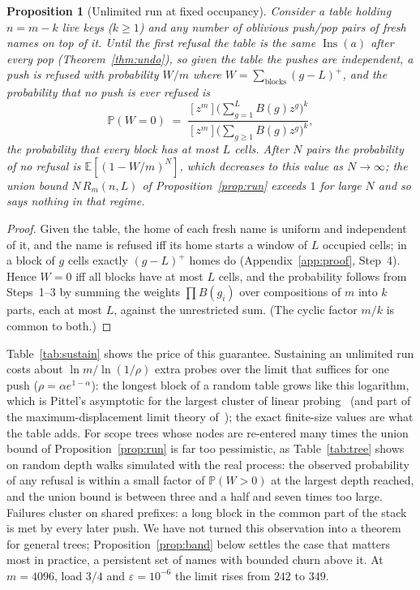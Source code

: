 \documentclass[11pt,a4paper]{article}
\newtheorem{proposition}[theorem]{Proposition}
\theoremstyle{definition}
\theoremstyle{remark}
\newcommand{\Prob}{\mathbb{P}}
\newcommand{\E}{\mathbb{E}}
\DeclareMathOperator{\Ins}{Ins}
\begin{document}
\begin{proposition}[Unlimited run at fixed occupancy]\label{prop:sustain}
Consider a table holding $n=m-k$ live keys ($k\ge1$) and any number of oblivious push/pop pairs of fresh names on top of it. Until the first refusal the table is the same $\Ins(a)$ after every pop (Theorem~\ref{thm:undo}), so given the table the pushes are independent, a push is refused with probability $W/m$ where $W=\sum_{\text{blocks}}(g-L)^+$, and the probability that \emph{no} push is ever refused is
\[
\Prob(W=0)\;=\;\frac{[z^m]\bigl(\sum_{g=1}^{L}B(g)z^g\bigr)^{k}}{[z^m]\bigl(\sum_{g\ge1}B(g)z^g\bigr)^{k}} ,
\]
the probability that every block has at most $L$ cells. After $N$ pairs the probability of no refusal is $\E[(1-W/m)^N]$, which decreases to this value as $N\to\infty$; the union bound $N\,R_m(n,L)$ of Proposition~\ref{prop:run} exceeds $1$ for large $N$ and so says nothing in that regime.
\end{proposition}
\begin{proof}
Given the table, the home of each fresh name is uniform and independent of it, and the name is refused iff its home starts a window of $L$ occupied cells; in a block of $g$ cells exactly $(g-L)^+$ homes do (Appendix~\ref{app:proof}, Step~4). Hence $W=0$ iff all blocks have at most $L$ cells, and the probability follows from Steps~1--3 by summing the weights $\prod B(g_i)$ over compositions of $m$ into $k$ parts, each at most $L$, against the unrestricted sum. (The cyclic factor $m/k$ is common to both.)
\end{proof}

Table~\ref{tab:sustain} shows the price of this guarantee. Sustaining an unlimited run costs about $\ln m/\ln(1/\rho)$ extra probes over the limit that suffices for one push ($\rho=\alpha e^{1-\alpha}$): the longest block of a random table grows like this logarithm, which is Pittel's asymptotic for the largest cluster of linear probing~\cite{pittel1987} (and part of the maximum-displacement limit theory of~\cite{petersson2009}); the exact finite-size values are what the table adds. For scope trees whose nodes are re-entered many times the union bound of Proposition~\ref{prop:run} is far too pessimistic, as Table~\ref{tab:tree} shows on random depth walks simulated with the real process: the observed probability of any refusal is within a small factor of $\Prob(W>0)$ at the largest depth reached, and the union bound is between three and a half and seven times too large. Failures cluster on shared prefixes: a long block in the common part of the stack is met by every later push. We have not turned this observation into a theorem for general trees; Proposition~\ref{prop:band} below settles the case that matters most in practice, a persistent set of names with bounded churn above it. At $m=4096$, load $3/4$ and $\varepsilon=10^{-6}$ the limit rises from $242$ to $349$.
\end{document}
